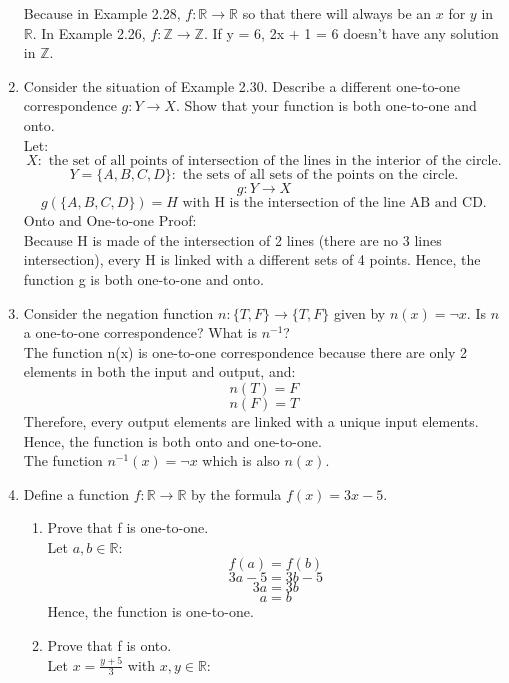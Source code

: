 \documentclass[12pt]{article}
\begin{document}
\begin{enumerate}
      Because in Example 2.28, $f:\mathds{R} \longrightarrow \mathds{R}$ so that there will always be an $x$ for $y$ in $\mathds{R}$.
      In Example 2.26, $f:\mathds{Z} \longrightarrow \mathds{Z}$. If y = 6, 2x + 1 = 6 doesn't have any solution in $\mathds{Z}$.
      \newpage
      \item Consider the situation of Example 2.30. Describe a different one-to-one correspondence $g: Y \longrightarrow X$. Show that your function is both one-to-one and onto.\\
      Let:
            \[X: \text{ the set of all points of intersection of the lines in the interior of the circle.}\]
            \[Y = \{A,B,C,D\}: \text{ the sets of all sets of the points on the circle.}\]
            \[g: Y \longrightarrow X\]
            \[g(\{A,B,C,D\}) = H \text{ with H is the intersection of the line AB and CD.}\]
      Onto and One-to-one Proof:\\
            Because H is made of the intersection of 2 lines (there are no 3 lines intersection), every H is linked with a different sets of 4 points. Hence, the function g is both one-to-one and onto.
      \item Consider the negation function \( n: \{T, F\} \rightarrow \{T, F\} \) given by \( n(x) = \neg x \). Is \( n \) a one-to-one correspondence? What is \( n^{-1} \)?\\
            The function n(x) is one-to-one correspondence because there are only 2 elements in both the input and output, and:
                  \[n(T) = F\]
                  \[n(F) = T\]
            Therefore, every output elements are linked with a unique input elements. Hence, the function is both onto and one-to-one.\\
            The function \(n^{-1}(x) = \neg x\) which is also \(n(x)\).
      \item Define a function \(f: \mathds{R} \longrightarrow \mathds{R}\) by the formula \(f(x) = 3x - 5\).
      \begin{enumerate}
            \item Prove that f is one-to-one.\\
            Let $a,b \in \mathds{R}$:
                  \[f(a) = f(b)\]
                  \[3a - 5 = 3b - 5\]
                  \[3a = 3b\]
                  \[a = b\]
            Hence, the function is one-to-one.            
            \item Prove that f is onto.\\
            Let $x = \frac{y+5}{3}$ with $x,y \in \mathds{R}$: 

\end{enumerate}
\end{enumerate}
\end{document}
